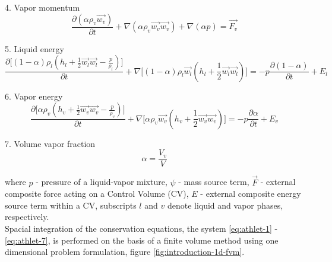 4. Vapor momentum
\begin{equation} \label{eq:athlet-4}
\frac{\partial (\alpha \rho_{v} \vec{w_{v}})}{\partial t} + \nabla (\alpha \rho_{v} \vec{w_{v}} \vec{w_{v}}) + \nabla (\alpha p) = \vec{F_{v}}
\end{equation}


5. Liquid energy
\begin{equation} \label{eq:athlet-5}
\frac{\partial \Big[ (1-\alpha)\rho_{l}(h_{l} + \frac{1}{2} \vec{w_{l}} \vec{w_{l}} - \frac{p}{\rho_{l}}) \Big]}{\partial t} + \nabla \Big[ (1-\alpha)\rho_{l}\vec{w_{l}}(h_{l} + \frac{1}{2} \vec{w_{l}} \vec{w_{l}}) \Big] = - p \frac{\partial (1 - \alpha)}{\partial t} + E_{l}
\end{equation}


6. Vapor energy
\begin{equation} \label{eq:athlet-6}
\frac{\partial \Big[ \alpha \rho_{v}(h_{v} + \frac{1}{2} \vec{w_{v}} \vec{w_{v}} - \frac{p}{\rho_{v}}) \Big]}{\partial t} + \nabla \Big[ \alpha\rho_{v}\vec{w_{v}}(h_{v} + \frac{1}{2} \vec{w_{v}} \vec{w_{v}}) \Big] = - p \frac{\partial \alpha}{\partial t} + E_{v}
\end{equation}

7. Volume vapor fraction
\begin{equation} \label{eq:athlet-7}
	\alpha = \frac{V_{v}}{V}
\end{equation}


where $p$ - pressure of a liquid-vapor mixture, $\psi$ - mass source term, $\vec{F}$ - external composite force acting on a Control Volume (CV), $E$ - external composite energy source term within a CV, subscripts $l$ and $v$ denote liquid and vapor phases, respectively. \\


Spacial integration of the conservation equations, the system \ref{eq:athlet-1} - \ref{eq:athlet-7}, is performed on the basis of a finite volume method using one dimensional problem formulation, figure \ref{fig:introduction-1d-fvm}.


